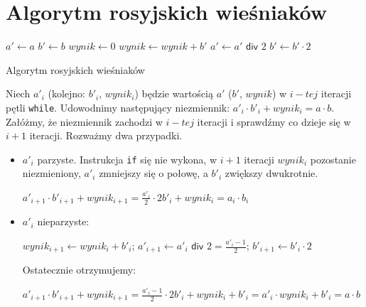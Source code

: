 \section{Algorytm rosyjskich wieśniaków}

\begin{algorithm}[h]
  \DontPrintSemicolon
  
  
  
  $a' \leftarrow a$\;
  $b' \leftarrow b$\;
  $wynik \leftarrow 0$\;
  {
    {
      $wynik \leftarrow wynik + b'$\;
    }
    $a' \leftarrow a' \textsf{ div } 2$\;
    $b' \leftarrow b' \cdot 2$\;
  }
  
  \caption{Algorytm rosyjskich wieśniaków}
  \label{alg-wiesniakow}
\end{algorithm}

Niech $a'_i$ (kolejno: $b'_i$, $wynik_i$) będzie wartością $a'$ ($b'$, $wynik$) w $i-tej$ iteracji pętli \texttt{while}. Udowodnimy następujący niezmiennik: $a'_i \cdot b'_i + wynik_i = a \cdot b$. Załóżmy, że niezmiennik zachodzi w $i-tej$ iteracji i sprawdźmy co dzieje się w $i+1$ iteracji. Rozważmy dwa przypadki.


\begin{itemize}
    \item $a'_i$ parzyste. Instrukcja \texttt{if} się nie wykona, w $i+1$ iteracji $wynik_i$ pozostanie niezmieniony, $a'_i$ zmniejszy się o połowę, a $b'_i$ zwiększy dwukrotnie. 

$a'_{i+1} \cdot b'_{i+1} + wynik_{i+1} = \frac{a'_i}{2} \cdot 2 b'_i + wynik_i = a_i \cdot b_i$


\item $a'_i$ nieparzyste:

$wynik_{i+1} \leftarrow wynik_i + b'_i$;  
$a'_{i+1} \leftarrow a'_i \textsf{ div } 2 = \frac{a'_i-1}{2}$;  
$b'_{i+1} \leftarrow b'_i \cdot 2$

Ostatecznie otrzymujemy:

$a'_{i+1} \cdot b'_{i+1} + wynik_{i+1} = \frac{a'_i-1}{2} \cdot 2 b'_i + wynik_i +b'_i = a'_i \cdot wynik_i + b'_i= a \cdot b$

\end{itemize}

